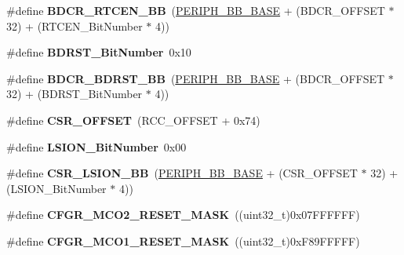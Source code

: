 \begin{DoxyCompactItemize}
\#define {\bfseries B\+D\+C\+R\+\_\+\+R\+T\+C\+E\+N\+\_\+\+BB}~(\hyperlink{group___peripheral__memory__map_gaed7efc100877000845c236ccdc9e144a}{P\+E\+R\+I\+P\+H\+\_\+\+B\+B\+\_\+\+B\+A\+SE} + (B\+D\+C\+R\+\_\+\+O\+F\+F\+S\+ET $\ast$ 32) + (R\+T\+C\+E\+N\+\_\+\+Bit\+Number $\ast$ 4))
\item 
\mbox{\label{group___r_c_c_gae6718158034388d8fde8caaa28ffe8b9}} 
\#define {\bfseries B\+D\+R\+S\+T\+\_\+\+Bit\+Number}~0x10
\item 
\mbox{\label{group___r_c_c_ga892fdf297b85b85cbaf0723649b31818}} 
\#define {\bfseries B\+D\+C\+R\+\_\+\+B\+D\+R\+S\+T\+\_\+\+BB}~(\hyperlink{group___peripheral__memory__map_gaed7efc100877000845c236ccdc9e144a}{P\+E\+R\+I\+P\+H\+\_\+\+B\+B\+\_\+\+B\+A\+SE} + (B\+D\+C\+R\+\_\+\+O\+F\+F\+S\+ET $\ast$ 32) + (B\+D\+R\+S\+T\+\_\+\+Bit\+Number $\ast$ 4))
\item 
\mbox{\label{group___r_c_c_ga984cbe73312b6d3d355c5053763d499a}} 
\#define {\bfseries C\+S\+R\+\_\+\+O\+F\+F\+S\+ET}~(R\+C\+C\+\_\+\+O\+F\+F\+S\+ET + 0x74)
\item 
\mbox{\label{group___r_c_c_ga3f9dbe50769ce2a63ae12520433b9b40}} 
\#define {\bfseries L\+S\+I\+O\+N\+\_\+\+Bit\+Number}~0x00
\item 
\mbox{\label{group___r_c_c_gaa253e36e7e5fb02998c0e4d0388abc52}} 
\#define {\bfseries C\+S\+R\+\_\+\+L\+S\+I\+O\+N\+\_\+\+BB}~(\hyperlink{group___peripheral__memory__map_gaed7efc100877000845c236ccdc9e144a}{P\+E\+R\+I\+P\+H\+\_\+\+B\+B\+\_\+\+B\+A\+SE} + (C\+S\+R\+\_\+\+O\+F\+F\+S\+ET $\ast$ 32) + (L\+S\+I\+O\+N\+\_\+\+Bit\+Number $\ast$ 4))
\item 
\mbox{\label{group___r_c_c_gabd7dd9cf31a9cc27fd9c0c1624f9a298}} 
\#define {\bfseries C\+F\+G\+R\+\_\+\+M\+C\+O2\+\_\+\+R\+E\+S\+E\+T\+\_\+\+M\+A\+SK}~((uint32\+\_\+t)0x07\+F\+F\+F\+F\+F\+F)
\item 
\mbox{\label{group___r_c_c_ga51f5130a66963090dc02b4ebd47e2f83}} 
\#define {\bfseries C\+F\+G\+R\+\_\+\+M\+C\+O1\+\_\+\+R\+E\+S\+E\+T\+\_\+\+M\+A\+SK}~((uint32\+\_\+t)0x\+F89\+F\+F\+F\+F\+F)
\item 
\mbox{\label{group___r_c_c_ga890221cb651a3f30f6d1bca0d9b0e13d}} 

\end{DoxyCompactItemize}
